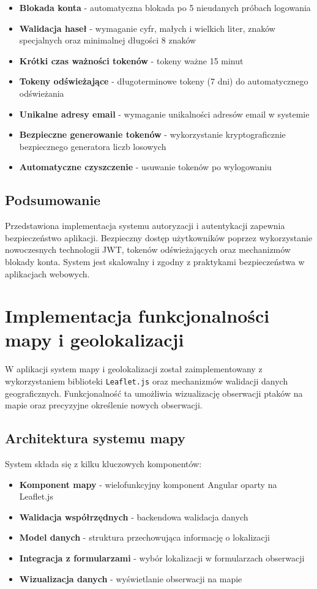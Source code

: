 \begin{itemize}
	\item \textbf{Blokada konta} - automatyczna blokada po 5 nieudanych próbach logowania
	\item \textbf{Walidacja haseł} - wymaganie cyfr, małych i wielkich liter, znaków specjalnych oraz minimalnej długości 8 znaków
	\item \textbf{Krótki czas ważności tokenów} - tokeny ważne 15 minut
	\item \textbf{Tokeny odświeżające} - długoterminowe tokeny (7 dni) do automatycznego odświeżania
	\item \textbf{Unikalne adresy email} - wymaganie unikalności adresów email w systemie
	\item \textbf{Bezpieczne generowanie tokenów} - wykorzystanie kryptograficznie bezpiecznego generatora liczb losowych
	\item \textbf{Automatyczne czyszczenie} - usuwanie tokenów po wylogowaniu
\end{itemize}

\subsection{Podsumowanie}
Przedstawiona implementacja systemu autoryzacji i autentykacji zapewnia bezpieczeństwo aplikacji. Bezpieczny dostęp użytkowników poprzez wykorzystanie nowoczesnych technologii JWT, tokenów odświeżających oraz mechanizmów blokady konta. System jest skalowalny i zgodny z praktykami bezpieczeństwa w aplikacjach webowych.

\section{Implementacja funkcjonalności mapy i geolokalizacji}
W aplikacji system mapy i geolokalizacji został zaimplementowany z wykorzystaniem biblioteki \texttt{Leaflet.js} oraz mechanizmów walidacji danych geograficznych. Funkcjonalność ta umożliwia wizualizację obserwacji ptaków na mapie oraz precyzyjne określenie nowych obserwacji.

\subsection{Architektura systemu mapy}
System składa się z kilku kluczowych komponentów:

\begin{itemize}
	\item \textbf{Komponent mapy} - wielofunkcyjny komponent Angular oparty na Leaflet.js
	\item \textbf{Walidacja współrzędnych} - backendowa walidacja danych
	\item \textbf{Model danych} - struktura przechowująca informację o lokalizacji
	\item \textbf{Integracja z formularzami} - wybór lokalizacji w formularzach obserwacji
	\item \textbf{Wizualizacja danych} - wyświetlanie obserwacji na mapie
\end{itemize}

